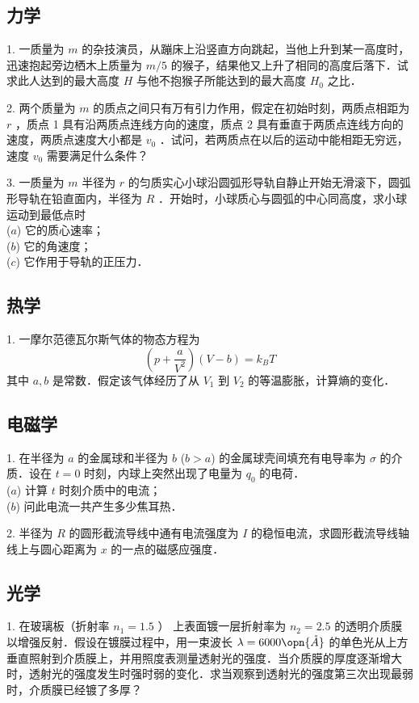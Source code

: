 
\subsection{力学}
1. 一质量为 $m$ 的杂技演员，从蹦床上沿竖直方向跳起，当他上升到某一高度时，迅速抱起旁边栖木上质量为 $m/5$ 的猴子，结果他又上升了相同的高度后落下．试求此人达到的最大高度 $H$ 与他不抱猴子所能达到的最大高度 $H_{0}$ 之比．

2. 两个质量为 $m$ 的质点之间只有万有引力作用，假定在初始时刻，两质点相距为 $r$ ，质点 1 具有沿两质点连线方向的速度，质点 2 具有垂直于两质点连线方向的速度，两质点速度大小都是 $v_{0}$ ．试问，若两质点在以后的运动中能相距无穷远，速度 $v_0$ 需要满足什么条件？

3. 一质量为 $m$ 半径为 $r$ 的匀质实心小球沿圆弧形导轨自静止开始无滑滚下，圆弧形导轨在铅直面内，半径为 $R$ ．开始时，小球质心与圆弧的中心同高度，求小球运动到最低点时\\ 
($a$) 它的质心速率；\\
($b$) 它的角速度；\\
($c$) 它作用于导轨的正压力．
\subsection{热学}
1. 一摩尔范德瓦尔斯气体的物态方程为 
\begin{equation}
\left(p+\frac{a}{V^{2}}\right)(V-b)=k_{B} T
\end{equation}
其中 $a, b$ 是常数．假定该气体经历了从 $V_{1}$ 到 $V_{2}$ 的等温膨胀，计算熵的变化．
\subsection{电磁学}
1. 在半径为 $a$ 的金属球和半径为 $b$ ($b>a$) 的金属球壳间填充有电导率为 $\sigma$ 的介质．设在 $t=0$ 时刻，内球上突然出现了电量为 $q_0$ 的电荷．\\
($a$) 计算 $t$ 时刻介质中的电流；\\
($b$) 问此电流一共产生多少焦耳热．

2. 半径为 $R$ 的圆形截流导线中通有电流强度为 $I$ 的稳恒电流，求圆形截流导线轴线上与圆心距离为 $x$ 的一点的磁感应强度．
\subsection{光学}
1. 在玻璃板（折射率 $n_{1}=1.5$ ） 上表面镀一层折射率为 $n_{2}=2.5$ 的透明介质膜以增强反射．假设在镀膜过程中，用一束波长 $\lambda=6000 \opn{\mathring{A}}$ 的单色光从上方垂直照射到介质膜上，并用照度表测量透射光的强度．当介质膜的厚度逐渐增大时，透射光的强度发生时强时弱的变化．求当观察到透射光的强度第三次出现最弱时，介质膜已经镀了多厚？